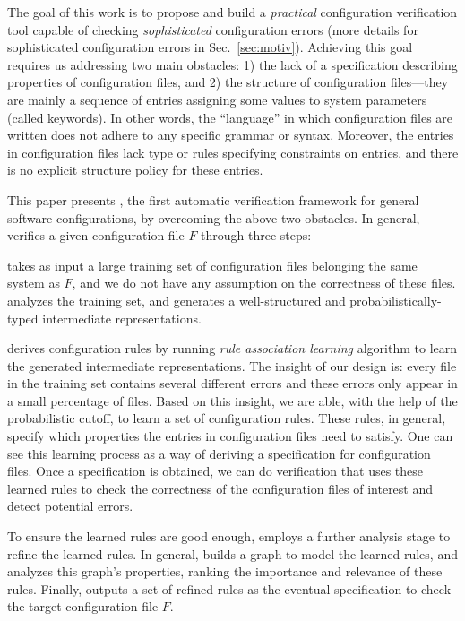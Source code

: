 \squishend

The goal of this work is to propose and build a {\em practical} 
configuration
verification tool capable of checking {\em sophisticated} 
configuration errors (more details
for sophisticated configuration errors in Sec.~\ref{sec:motiv}).
Achieving this goal requires us addressing two main obstacles:
1) the lack of a specification describing properties of configuration
files, and 2) the structure of configuration files---they are 
mainly a sequence of entries assigning some values to system
parameters (called keywords).
In other words, the ``language'' in which configuration 
files are written does not adhere to any specific grammar or syntax. 
Moreover, the entries in configuration files 
lack type or rules specifying constraints on entries, 
and there is no explicit structure policy for these entries.

This paper presents \app, the first automatic verification framework
for general software configurations, by overcoming the above two
obstacles. In general, \app verifies a given configuration file $F$ 
through three steps:

\app takes as input a large training set of configuration files
belonging the same system as $F$,
and we do not have any assumption on the correctness of these files.
\app analyzes the training set, and generates a well-structured and
probabilistically-typed intermediate representations.

\app derives configuration rules by running {\em rule association
learning} algorithm to learn the generated intermediate representations.
The insight of our design is: every file in the training set
contains several different errors and these errors only appear 
in a small percentage of files. Based on this insight,
we are able, with the help of the probabilistic cutoff, to learn a
set of configuration rules. These rules, in general, specify 
which properties the entries in configuration files need to satisfy. 
One can see this learning process as a way of deriving  
a specification for configuration files.  
Once a specification is obtained, we can do verification that 
uses these learned rules to check the correctness of 
the configuration files
of interest and detect potential errors.

To ensure the learned rules are good enough,
\app employs a further analysis stage to refine the learned rules.
In general, \app builds a graph to model the learned rules,
and analyzes this graph's properties, ranking the importance
and relevance of these rules. Finally, \app outputs
a set of refined rules as the eventual specification
to check the target configuration file $F$.

